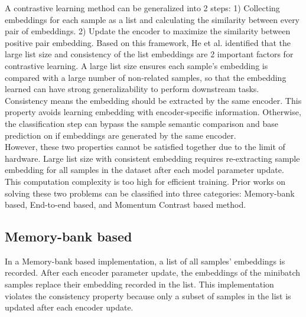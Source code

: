 \documentclass[12pt,twoside]{report}
\begin{document}
A contrastive learning method can be generalized into 2 steps: 1) Collecting embeddings for each sample as a list and calculating the similarity between every pair of embeddings. 2) Update the encoder to maximize the similarity between positive pair embedding. Based on this framework, He et al.\cite{moco} identified that the large list size and consistency of the list embeddings are 2 important factors for contrastive learning. A large list size ensures each sample's embedding is compared with a large number of non-related samples, so that the embedding learned can have strong generalizability to perform downstream tasks. Consistency means the embedding should be extracted by the same encoder. This property avoids learning embedding with encoder-specific information. Otherwise, the classification step can bypass the sample semantic comparison and base prediction on if embeddings are generated by the same encoder. \\

However, these two properties cannot be satisfied together due to the limit of hardware. Large list size with consistent embedding requires re-extracting sample embedding for all samples in the dataset after each model parameter update. This computation complexity is too high for efficient training. Prior works on solving these two problems can be classified into three categories: Memory-bank based, End-to-end based, and Momentum Contrast based method. 

\subsection{Memory-bank based}
In a Memory-bank based implementation, a list of all samples' embeddings is recorded. After each encoder parameter update, the embeddings of the minibatch samples replace their embedding recorded in the list. This implementation violates the consistency property because only a subset of samples in the list is updated after each encoder update.\\
\end{document}
